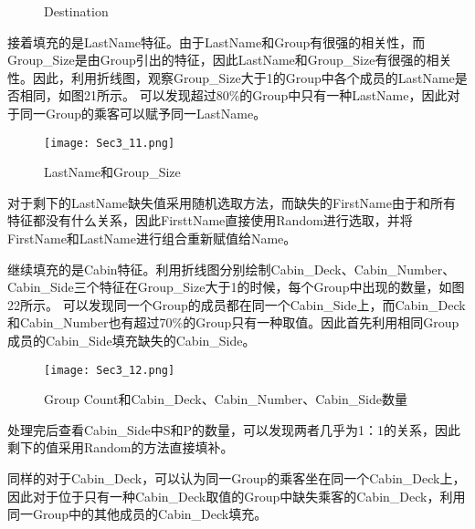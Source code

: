 \documentclass[../main.tex]{subfiles}
\begin{document}
            \begin{figure}[H]
                \centering
                
                \caption{Destination}
            \end{figure}

            接着填充的是LastName特征。由于LastName和Group有很强的相关性，而Group\_Size是由Group引出的特征，因此LastName和Group\_Size有很强的相关性。因此，利用折线图，观察Group\_Size大于1的Group中各个成员的LastName是否相同，如图21所示。
            可以发现超过80\%的Group中只有一种LastName，因此对于同一Group的乘客可以赋予同一LastName。

            \begin{figure}[H]
                \centering
                \texttt{[image: Sec3\_11.png]}
                \caption{LastName和Group\_Size}
            \end{figure}

            对于剩下的LastName缺失值采用随机选取方法，而缺失的FirstName由于和所有特征都没有什么关系，因此FirsttName直接使用Random进行选取，并将FirstName和LastName进行组合重新赋值给Name。

            继续填充的是Cabin特征。利用折线图分别绘制Cabin\_Deck、Cabin\_Number、Cabin\_Side三个特征在Group\_Size大于1的时候，每个Group中出现的数量，如图22所示。
            可以发现同一个Group的成员都在同一个Cabin\_Side上，而Cabin\_Deck和Cabin\_Number也有超过70\%的Group只有一种取值。因此首先利用相同Group成员的Cabin\_Side填充缺失的Cabin\_Side。

            \begin{figure}[H]
                \centering
                \texttt{[image: Sec3\_12.png]}
                \caption{Group Count和Cabin\_Deck、Cabin\_Number、Cabin\_Side数量}
            \end{figure}

            处理完后查看Cabin\_Side中S和P的数量，可以发现两者几乎为1：1的关系，因此剩下的值采用Random的方法直接填补。

            同样的对于Cabin\_Deck，可以认为同一Group的乘客坐在同一个Cabin\_Deck上，因此对于位于只有一种Cabin\_Deck取值的Group中缺失乘客的Cabin\_Deck，利用同一Group中的其他成员的Cabin\_Deck填充。
\end{document}

